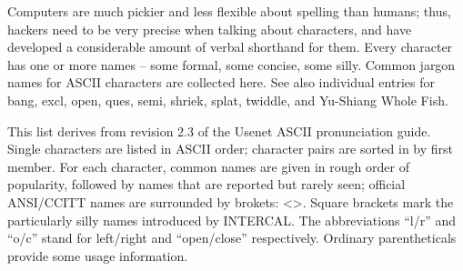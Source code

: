 \documentclass[10pt,twoside,openright]{memoir}
\begin{document}
Computers are much pickier and less flexible about spelling than humans; thus, hackers need to be very precise when talking about characters, and have developed a considerable amount of verbal shorthand for them. Every character has one or more names -- some formal, some concise, some silly. Common jargon names for ASCII characters are collected here. See also individual entries for bang, excl, open, ques, semi, shriek, splat, twiddle, and Yu-Shiang Whole Fish.

This list derives from revision 2.3 of the Usenet ASCII pronunciation guide. Single characters are listed in ASCII order; character pairs are sorted in by first member. For each character, common names are given in rough order of popularity, followed by names that are reported but rarely seen; official ANSI/CCITT names are surrounded by brokets: <>. Square brackets mark the particularly silly names introduced by INTERCAL. The abbreviations ``l/r'' and ``o/c'' stand for left/right and ``open/close'' respectively. Ordinary parentheticals provide some usage information.

\vskip 0.2in
\end{document}
